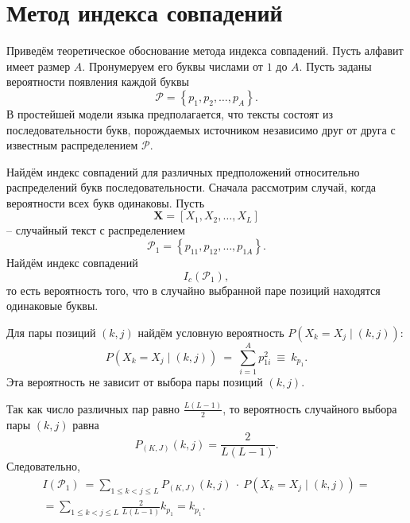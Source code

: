 \section{Метод индекса совпадений}
\label{chap:coincide-index}

Приведём теоретическое обоснование метода индекса совпадений. Пусть алфавит имеет размер $A$. Пронумеруем его буквы числами от $1$ до $A$. Пусть заданы вероятности появления каждой буквы
    \[ \mathcal{P} = \left\{ {p_1 ,p_2 , \ldots , p_A } \right\}. \]
В простейшей модели языка предполагается, что тексты состоят из последовательности букв, порождаемых источником независимо друг от друга с известным распределением $\mathcal{P}$.

Найдём индекс совпадений для различных предположений относительно распределений букв последовательности. Сначала рассмотрим случай, когда вероятности всех букв одинаковы. Пусть
    \[ \mathbf{X} = \left[ X_1, X_2, \dots, X_L \right] \]
-- случайный текст с распределением
    \[ \mathcal{P}_1 = \left\{ p_{11}, p_{12}, \dots, p_{1A} \right\}. \]
Найдём индекс совпадений
    \[ I_c(\mathcal{P}_1), \]
то есть вероятность того, что в случайно выбранной паре позиций находятся одинаковые буквы.

Для пары позиций $(k,j)$ найдём условную вероятность $P \left( X_k  = X_j \mid (k,j) \right)$:
    \[ P \left( X_k  = X_j \mid (k,j) \right) ~=~ \sum\limits_{i=1}^A p_{1i}^2 ~\equiv~ k_{p_1}. \]
Эта вероятность не зависит от выбора пары позиций $(k,j)$.

Так как число различных пар равно $\frac{L(L - 1)}{2}$, то вероятность случайного выбора пары $(k,j)$ равна
    \[ P_{(K,J)} (k,j) = \frac{2}{L(L - 1)}. \]
Следовательно,
\begin{multline*}
    I(\mathcal{P}_1) ~= \sum \limits_{1 \leq k < j \leq L} P_{(K,J)}(k,j) ~\cdot~ P(X_k  = X_j \mid (k,j)) =\\
    = \sum \limits_{1 \leq k < j \leq L} \frac{2}{L(L - 1)} k_{p_1} = k_{p_1}.
\end{multline*}

